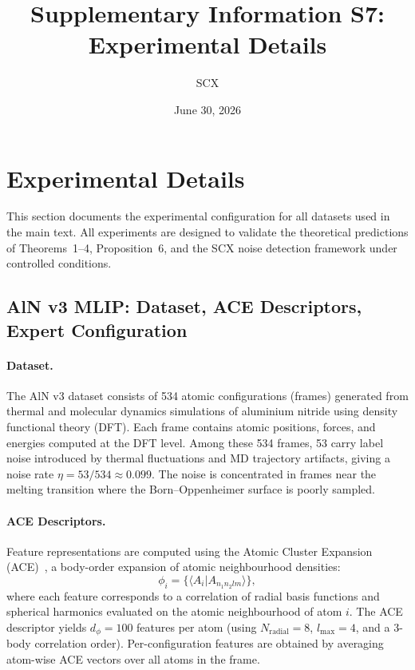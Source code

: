 \documentclass[article]{amsart}
\title{Supplementary Information S7: Experimental Details}
\author{SCX}
\date{June 30, 2026}
\theoremstyle{definition}
\begin{document}
\maketitle

\section{Experimental Details}

This section documents the experimental configuration for all datasets used in the main text. All experiments are designed to validate the theoretical predictions of Theorems~1--4, Proposition~6, and the SCX noise detection framework under controlled conditions.

\subsection{AlN v3 MLIP: Dataset, ACE Descriptors, Expert Configuration}

\paragraph{Dataset.}
The AlN v3 dataset consists of 534 atomic configurations (frames) generated from thermal and molecular dynamics simulations of aluminium nitride using density functional theory (DFT). Each frame contains atomic positions, forces, and energies computed at the DFT level. Among these 534 frames, 53 carry label noise introduced by thermal fluctuations and MD trajectory artifacts, giving a noise rate $\eta = 53/534 \approx 0.099$. The noise is concentrated in frames near the melting transition where the Born--Oppenheimer surface is poorly sampled.

\paragraph{ACE Descriptors.}
Feature representations are computed using the Atomic Cluster Expansion (ACE)~\cite{drautz2019ace}, a body-order expansion of atomic neighbourhood densities:
\begin{equation}
\phi_i = \bigl\{ \langle A_i | A_{n_1 n_2 l m} \rangle \bigr\},
\end{equation}
where each feature corresponds to a correlation of radial basis functions and spherical harmonics evaluated on the atomic neighbourhood of atom $i$. The ACE descriptor yields $d_\phi = 100$ features per atom (using $N_{\text{radial}} = 8$, $l_{\max} = 4$, and a 3-body correlation order). Per-configuration features are obtained by averaging atom-wise ACE vectors over all atoms in the frame.
\end{document}
